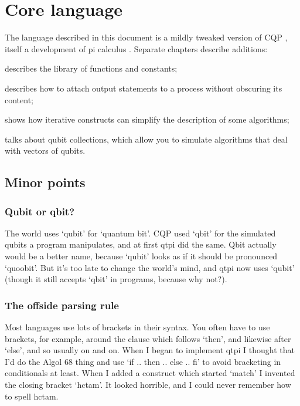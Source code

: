 
\chapter{Core language}

The language described in this document is a mildly tweaked version of CQP \citep{GaySJ:comqp}, itself a development of pi calculus \citep{DBLP:journals/iandc/MilnerPW92a}. Separate chapters describe additions:  

\begin{itemize*}
\item{} describes the library of functions and constants;
\item{} describes how to attach output statements to a process without obscuring its content;  
\item{} shows how iterative constructs can simplify the description of some algorithms;  
\item{} talks about qubit collections, which allow you to simulate algorithms that deal with vectors of qubits.
\end{itemize*}

\section{Minor points}
\subsection{Qubit or qbit?}
The world uses `qubit' for `quantum bit'. CQP used `qbit' for the simulated qubits a program manipulates, and at first qtpi did the same. Qbit actually would be a better name, because `qubit' looks as if it should be pronounced `quoobit'. But it's too late to change the world's mind, and qtpi now uses `qubit' (though it still accepts `qbit' in programs, because why not?).

\subsection{The offside parsing rule}

Most languages use lots of brackets in their syntax. You often have to use brackets, for example, around the clause which follows `then', and likewise after `else', and so usually on and on. When I began to implement qtpi I thought that I'd do the Algol 68 thing and use `if .. then .. else .. fi' to avoid bracketing in conditionals at least. When I added a construct which started `match' I invented the closing bracket `hctam'. It looked horrible, and I could never remember how to spell hctam.

